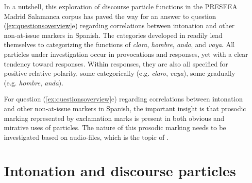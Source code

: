 In a nutshell, this exploration of discourse particle functions in the PRESEEA Madrid Salamanca corpus has paved the way for an answer to question (\ref{ex:questionsoverview}e) regarding correlations between intonation and other non-at-issue markers in Spanish. The categories developed in  readily lend themselves to categorizing the functions of \textit{claro}, \textit{hombre}, \textit{anda}, and \textit{vaya}. All particles under investigation occur in provocations and responses, yet with a clear tendency toward responses. Within responses, they are also all specified for positive relative polarity, some categorically (e.g. \textit{claro}, \textit{vaya}), some gradually (e.g. \textit{hombre}, \textit{anda}).\largerpage[2]

For question (\ref{ex:questionsoverview}e) regarding correlations between intonation and other non-at-issue markers in Spanish, the important insight is that prosodic marking represented by exclamation marks is present in both obvious and mirative uses of particles. The nature of this prosodic marking needs to be investigated based on audio-files, which is the topic of .

\section{Intonation and discourse particles}\label{ch:5.2}

